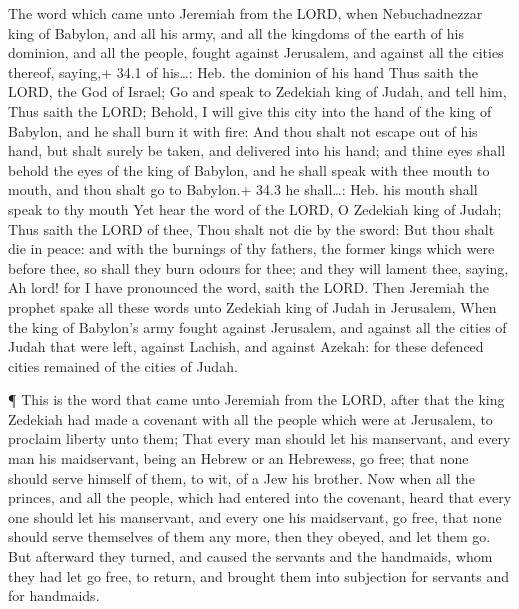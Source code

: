  The word which came unto Jeremiah from the LORD, when
Nebuchadnezzar king of Babylon, and all his army, and all the kingdoms
of the earth of his dominion, and all the people, fought against
Jerusalem, and against all the cities thereof, saying,+ 34.1 of
his\ldots: Heb. the dominion of his hand  Thus saith the
LORD, the God of Israel; Go and speak to Zedekiah king of Judah, and
tell him, Thus saith the LORD; Behold, I will give this city into the
hand of the king of Babylon, and he shall burn it with fire:
 And thou shalt not escape out of his hand, but shalt surely
be taken, and delivered into his hand; and thine eyes shall behold the
eyes of the king of Babylon, and he shall speak with thee mouth to
mouth, and thou shalt go to Babylon.+ 34.3 he shall\ldots: Heb. his
mouth shall speak to thy mouth  Yet hear the word of the
LORD, O Zedekiah king of Judah; Thus saith the LORD of thee, Thou shalt
not die by the sword:  But thou shalt die in peace: and with
the burnings of thy fathers, the former kings which were before thee, so
shall they burn odours for thee; and they will lament thee, saying, Ah
lord! for I have pronounced the word, saith the LORD.  Then
Jeremiah the prophet spake all these words unto Zedekiah king of Judah
in Jerusalem,  When the king of Babylon's army fought
against Jerusalem, and against all the cities of Judah that were left,
against Lachish, and against Azekah: for these defenced cities remained
of the cities of Judah.

 ¶ This is the word that came unto Jeremiah from the LORD,
after that the king Zedekiah had made a covenant with all the people
which were at Jerusalem, to proclaim liberty unto them; 
That every man should let his manservant, and every man his maidservant,
being an Hebrew or an Hebrewess, go free; that none should serve himself
of them, to wit, of a Jew his brother.  Now when all the
princes, and all the people, which had entered into the covenant, heard
that every one should let his manservant, and every one his maidservant,
go free, that none should serve themselves of them any more, then they
obeyed, and let them go.  But afterward they turned, and
caused the servants and the handmaids, whom they had let go free, to
return, and brought them into subjection for servants and for handmaids.

